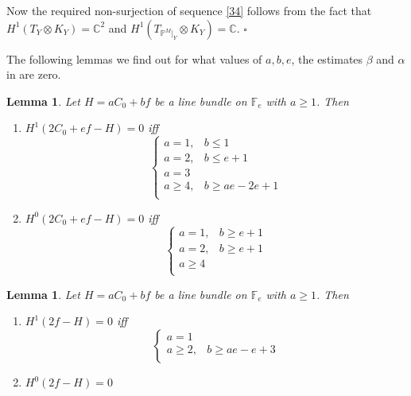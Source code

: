 \documentclass[11pt,twoside]{amsart}
\theoremstyle{plain}
\numberwithin{equation}{section}
\newtheorem{lemma}[theorem]{Lemma}
\theoremstyle{definition}
\newcommand*{\QEDB}{\hfill\ensuremath{\square}}
\begin{document}
Now the required non-surjection of sequence \ref{34} follows from the fact that $H^1(T_Y \otimes K_Y) = \mathbb{C}^2$ and $H^1(T_{\mathbb{P}^M|_Y} \otimes K_Y) = \mathbb{C}$. \QEDB

The following lemmas we find out for what values of $a, b, e$, the estimates $\beta$ and $\alpha$ in  are zero.


\begin{lemma}\label{2C_0+ef-H}
Let $H = aC_0+bf$ be a line bundle on $\mathbb{F}_e$ with $a \geq 1$. Then 
\begin{enumerate}
    \item[(1)] $H^1(2C_0+ef-H) = 0$ iff 
\[
\begin{cases}
   a = 1, & b \leq 1  \\
   a = 2, & b \leq e+1 \\
   a = 3 & \\
   a \geq 4, & b \geq ae-2e+1 \\
\end{cases}
\]

\item[(2)] $H^0(2C_0+ef-H) = 0$ iff 
\[
\begin{cases}
   a = 1, & b \geq e+1  \\
   a = 2, & b \geq e+1 \\
   a \geq 4 & \\
\end{cases}
\] 

\end{enumerate}

    
\end{lemma}

\begin{lemma}\label{2f-H}
Let $H = aC_0+bf$ be a line bundle on $\mathbb{F}_e$ with $a \geq 1$. Then 
\begin{enumerate}
    \item[(1)] $H^1(2f-H) = 0$ iff 
\[
\begin{cases}
   a = 1 &   \\
   a \geq 2, & b \geq ae-e+3 \\
   
\end{cases}
\]

\item[(2)] $H^0(2f-H) = 0$ 



\end{enumerate}  

\end{lemma}
\end{document}
